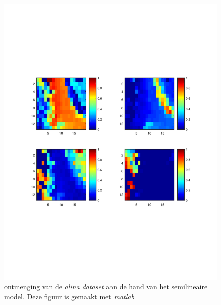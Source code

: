 \documentclass[12pt]{report}
\begin{document}
\begin{figure}
\includegraphics[width=0.99\linewidth,trim=0 200 0 175 cm]{semilinMESMA.pdf}
\caption{ontmenging van de \textit{alina dataset}\cite{alina} aan de hand van het semilineaire model. Deze figuur is gemaakt met \textit{matlab}\cite{MATLAB} \label{fig:asl}}
\end{figure}
\end{document}
